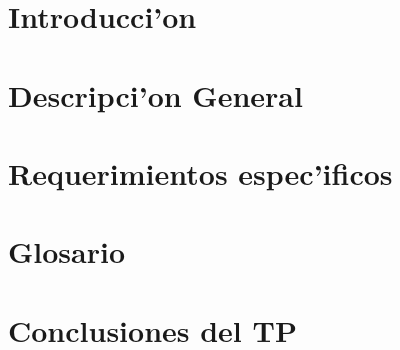\documentclass[spanish, a4paper, 10pt, titlepage]{article}
\author{Echevarr'ia - Farjat - Freijo - Giusto}
\begin{document}

\tableofcontents
\clearpage


\section{Introducci'on}


\clearpage

\section{Descripci'on General	}
 
\clearpage

\section{Requerimientos espec'ificos}
 
\clearpage


\appendix

\section{Glosario}
%  
\clearpage

\section{Conclusiones del TP}
%  
\clearpage

\end{document}
